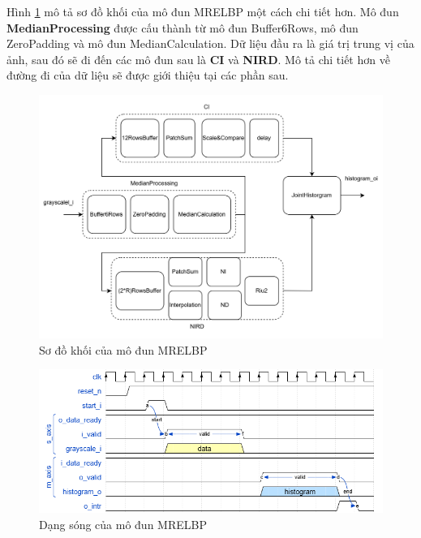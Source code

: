 Hình \ref{fig:mrelbpArchitecture} mô tả sơ đồ khối của mô đun MRELBP một cách chi tiết hơn. Mô đun \textbf{MedianProcessing} được cấu thành từ mô đun Buffer6Rows, mô đun ZeroPadding và mô đun MedianCalculation. Dữ liệu đầu ra là giá trị trung vị của ảnh, sau đó sẽ đi đến các mô đun sau là \textbf{CI} và \textbf{NIRD}. Mô tả chi tiết hơn về đường đi của dữ liệu sẽ được giới thiệu tại các phần sau.
\begin{figure} [!ht]
	\centering
\includegraphics[width=1\linewidth]{figures/mrelbpArchitecture.png}
	\caption{Sơ đồ khối của mô đun MRELBP}
	\label{fig:mrelbpArchitecture}
\end{figure}



\begin{figure} [!ht]
	\centering
\includegraphics[width=1\linewidth]{figures/mrelbp.png}
	\caption{Dạng sóng của mô đun MRELBP}
	\label{fig:mrelbpWaveform}
\end{figure}




\newpage
